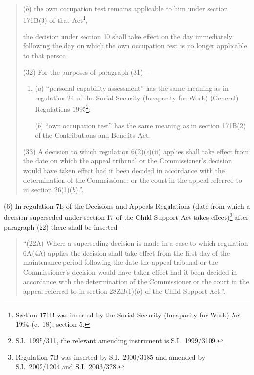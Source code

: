 \documentclass[12pt,a4paper]{article}
\begin{document}
\begin{enumerate}
\begin{quotation}
\begin{enumerate}
($b$) the own occupation test remains applicable to him under section 171B(3) of that Act\footnote{Section 171B was inserted by the Social Security (Incapacity for Work) Act 1994 (c.\ 18), section 5.},
\end{enumerate}
the decision under section 10 shall take effect on the day immediately following the day on which the own occupation test is no longer applicable to that person.

(32) For the purposes of paragraph (31)—
\begin{enumerate}\item[]
($a$) “personal capability assessment” has the same meaning as in regulation 24 of the Social Security (Incapacity for Work) (General) Regulations 1995\footnote{S.I.\ 1995/311, the relevant amending instrument is S.I.\ 1999/3109.};

($b$) “own occupation test” has the same meaning as in section 171B(2) of the Contributions and Benefits Act.
\end{enumerate}

(33) A decision to which regulation 6(2)($c$)(ii)  applies shall take effect from the date on which the appeal tribunal or the Commissioner’s decision would have taken effect had it been decided in accordance with the determination of the Commissioner or the court in the appeal referred to in section 26(1)($b$).”.
\end{quotation}
\end{enumerate}

(6) In regulation 7B of the Decisions and Appeals Regulations (date from which a decision superseded under section 17 of the Child Support Act takes effect)\footnote{Regulation 7B was inserted by S.I.\ 2000/3185 and amended by S.I.\ 2002/1204 and S.I.\ 2003/328.} after paragraph (22) there shall be inserted—
\begin{quotation}
“(22A) Where a superseding decision is made in a case to which regulation 6A(4A) applies the decision shall take effect from the first day of the maintenance period following the date the appeal tribunal or the Commissioner’s decision would have taken effect had it been decided in accordance with the determination of the Commissioner or the court in the appeal referred to in section 28ZB(1)($b$)  of the Child Support Act.”.
\end{quotation}

\end{document}
